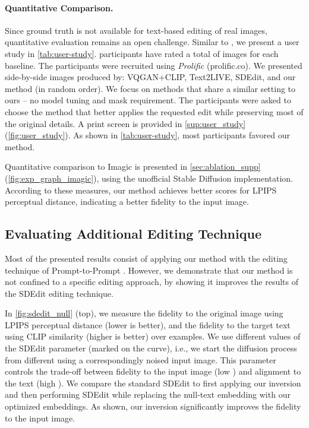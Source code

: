 \vspace{-0.3cm}
\paragraph{Quantitative Comparison.}

Since ground truth is not available for text-based editing of real images, quantitative evaluation remains an open challenge. Similar to \cite{bar2022text2live, hertz2022prompt}, we present a user study in \cref{tab:user-study}.  participants have rated a total of  images for each baseline. The participants were recruited using \emph{Prolific} (prolific.co). We presented side-by-side images produced by: VQGAN+CLIP, Text2LIVE, SDEdit, and our method (in random order). We focus on methods that share a similar setting to ours -- no model tuning and mask requirement. The participants were asked to choose the method that better applies the requested edit while preserving most of the original details. A print screen is provided in \cref{sup:user_study} (\cref{fig:user_study}).
As shown in \cref{tab:user-study}, most participants favored our method.


Quantitative comparison to Imagic is presented in \cref{sec:ablation_supp} (\cref{fig:exp_graph_imagic}), using the unofficial Stable Diffusion implementation. According to these measures, our method achieves better scores for LPIPS perceptual distance, indicating a better fidelity to the input image.

\label{tab:times}


\subsection{Evaluating Additional Editing Technique}


Most of the presented results consist of applying our method with the editing technique of Prompt-to-Prompt \cite{hertz2022prompt}. However, we demonstrate that our method is not confined to a specific editing approach, by showing it improves the results of the SDEdit \cite{meng2021sdedit} editing technique.

In \cref{fig:sdedit_null} (top), we measure the fidelity to the original image using LPIPS perceptual distance \cite{Zhang2018TheUE} (lower is better), and the fidelity to the target text using CLIP similarity \cite{radford2021learning} (higher is better) over  examples. We use different values of the SDEdit parameter  (marked on the curve), i.e., we start the diffusion process from different  using a correspondingly noised input image. This parameter controls the trade-off between fidelity to the input image (low ) and alignment to the text (high ). We compare the standard SDEdit to first applying our inversion and then performing SDEdit while replacing the null-text embedding with our optimized embeddings. As shown, our inversion significantly improves the fidelity to the input image.

